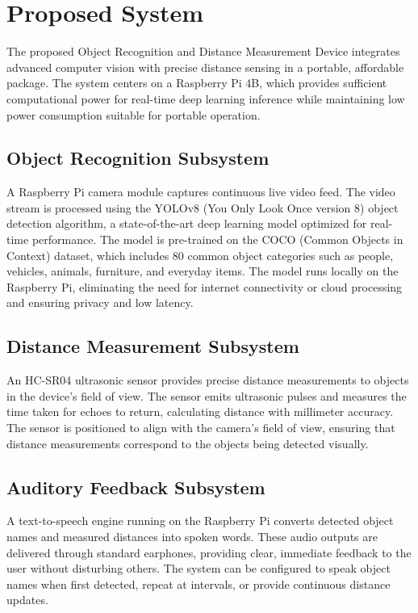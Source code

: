 \documentclass[conference]{IEEEtran}
\begin{document}
\section{Proposed System}
The proposed Object Recognition and Distance Measurement Device integrates advanced computer vision with precise distance sensing in a portable, affordable package. The system centers on a Raspberry Pi 4B, which provides sufficient computational power for real-time deep learning inference while maintaining low power consumption suitable for portable operation.

\subsection{Object Recognition Subsystem}
A Raspberry Pi camera module captures continuous live video feed. The video stream is processed using the YOLOv8 (You Only Look Once version 8) object detection algorithm, a state-of-the-art deep learning model optimized for real-time performance. The model is pre-trained on the COCO (Common Objects in Context) dataset, which includes 80 common object categories such as people, vehicles, animals, furniture, and everyday items. The model runs locally on the Raspberry Pi, eliminating the need for internet connectivity or cloud processing and ensuring privacy and low latency.

\subsection{Distance Measurement Subsystem}
An HC-SR04 ultrasonic sensor provides precise distance measurements to objects in the device's field of view. The sensor emits ultrasonic pulses and measures the time taken for echoes to return, calculating distance with millimeter accuracy. The sensor is positioned to align with the camera's field of view, ensuring that distance measurements correspond to the objects being detected visually.

\subsection{Auditory Feedback Subsystem}
A text-to-speech engine running on the Raspberry Pi converts detected object names and measured distances into spoken words. These audio outputs are delivered through standard earphones, providing clear, immediate feedback to the user without disturbing others. The system can be configured to speak object names when first detected, repeat at intervals, or provide continuous distance updates.
\end{document}

